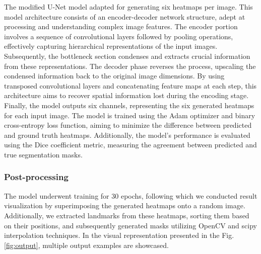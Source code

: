 \documentclass[runningheads]{llncs}
\begin{document}
The modified U-Net model adapted for generating six heatmaps per image. This model architecture consists of an encoder-decoder network structure, adept at processing and understanding complex image features. The encoder portion involves a sequence of convolutional layers followed by pooling operations, effectively capturing hierarchical representations of the input images. Subsequently, the bottleneck section condenses and extracts crucial information from these representations. The decoder phase reverses the process, upscaling the condensed information back to the original image dimensions. By using transposed convolutional layers and concatenating feature maps at each step, this architecture aims to recover spatial information lost during the encoding stage. Finally, the model outputs six channels, representing the six generated heatmaps for each input image. The model is trained using the Adam optimizer and binary cross-entropy loss function, aiming to minimize the difference between predicted and ground truth heatmaps. Additionally, the model's performance is evaluated using the Dice coefficient metric, measuring the agreement between predicted and true segmentation masks. 

\subsubsection{Post-processing}
The model underwent training for 30 epochs, following which we conducted result visualization by superimposing the generated heatmaps onto a random image. Additionally, we extracted landmarks from these heatmaps, sorting them based on their positions, and subsequently generated masks utilizing OpenCV and scipy interpolation techniques. In the visual representation presented in the Fig. \ref{fig:output}, multiple output examples are showcased.
\end{document}
